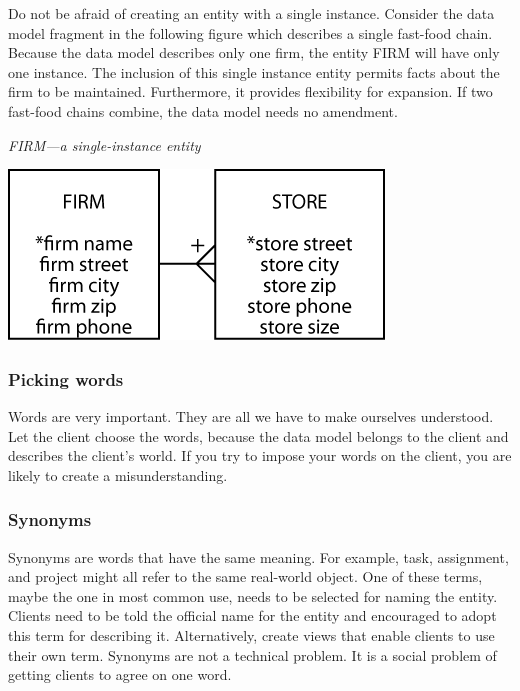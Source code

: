 \documentclass[
]{article}
\begin{document}
Do not be afraid of creating an entity with a single instance. Consider
the data model fragment in the following figure which describes a single
fast-food chain. Because the data model describes only one firm, the
entity FIRM will have only one instance. The inclusion of this single
instance entity permits facts about the firm to be maintained.
Furthermore, it provides flexibility for expansion. If two fast-food
chains combine, the data model needs no amendment.

\emph{FIRM---a single-instance entity}

\includegraphics{Figures/Chapter 7/single instance (firm).png}

\hypertarget{picking-words}{%
\subsubsection*{Picking words}\label{picking-words}}

Words are very important. They are all we have to make ourselves
understood. Let the client choose the words, because the data model
belongs to the client and describes the client's world. If you try to
impose your words on the client, you are likely to create a
misunderstanding.

\hypertarget{synonyms}{%
\subsubsection*{Synonyms}\label{synonyms}}

Synonyms are words that have the same meaning. For example, task,
assignment, and project might all refer to the same real-world object.
One of these terms, maybe the one in most common use, needs to be
selected for naming the entity. Clients need to be told the official
name for the entity and encouraged to adopt this term for describing it.
Alternatively, create views that enable clients to use their own term.
Synonyms are not a technical problem. It is a social problem of getting
clients to agree on one word.
\end{document}
